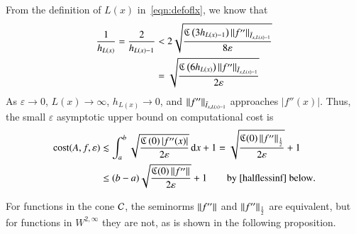 \documentclass[review]{elsarticle}
\newcommand{\abstol}{\varepsilon}
\theoremstyle{definition}
\renewcommand{\cw}{W}
\begin{document}
From the definition of $L(x)$ in~\eqref{eqn:defoflx}, we know that 
\begin{align*}
\frac{1}{h_{L(x)}} = \frac{2}{h_{L(x)-1}}  & < 2 \sqrt{\frac{\fC\left(3 h_{L(x)-1} \right)\norm[\bar{I}_{x,L(x)-1}]{f''} }{8\abstol}} \\
& = \sqrt{\frac{\fC\left(6 h_{L(x)} \right)\norm[\bar{I}_{x,L(x)-1}]{f''} }{2\abstol}}
\end{align*}
As $\abstol \to 0$, $L(x) \to \infty$, $h_{L(x)} \to 0$, and  $\norm[\bar{I}_{x,L(x)-1}]{f''}$ approaches $|f''(x)|$.  Thus, the small $\abstol$ asymptotic upper bound on computational cost is
\begin{align}
\cost(A,f,\abstol)  &\lesssim \int_a^b \sqrt{\frac{\fC\left(0\right)   |f''(x)|}{2\abstol}} \, \dif x +1  =\sqrt{\frac{\fC(0) \norm[\frac 12]{f''}}{2\abstol}} +1 \label{costbdapprox} \\
& \le (b-a)\sqrt{\frac{\fC(0) \norm{f''}}{2\abstol}} +1 \label{costbdinf}  \qquad \text{by \eqref{halflessinf} below}.
\end{align}

For functions in the cone $\cc$, the seminorms $\norm{f''}$ and $\norm[\frac
12]{f''}$ are equivalent, but  for functions in $ \cw^{2,\infty}$ they are not, as is shown in the following proposition.
\end{document}
